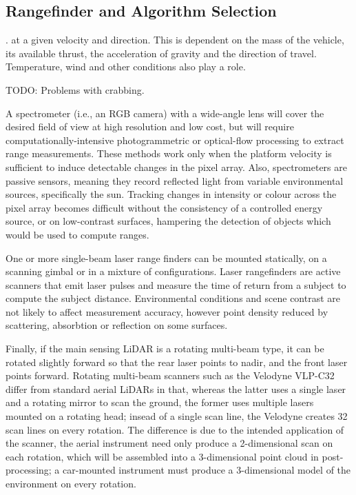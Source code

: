 \documentclass[10pt,a4paper]{report}
\begin{document}
\subsection{Rangefinder and Algorithm Selection}


.  at a given velocity and direction. This is dependent on the mass of the vehicle, its available thrust, the acceleration of gravity and the direction of travel. Temperature, wind and other conditions also play a role. 

TODO: Problems with crabbing.

A spectrometer (i.e., an RGB camera) with a wide-angle lens will cover the desired field of view at high resolution and low cost, but will require computationally-intensive photogrammetric or optical-flow processing to extract range measurements. These methods work only when the platform velocity is sufficient to induce detectable changes in the pixel array. Also, spectrometers are passive sensors, meaning they record reflected light from variable environmental sources, specifically the sun. Tracking changes in intensity or colour across the pixel array becomes difficult without the consistency of a controlled energy source, or on low-contrast surfaces, hampering the detection of objects which would be used to compute ranges.

One or more single-beam laser range finders can be mounted statically, on a scanning gimbal or in a mixture of configurations. Laser rangefinders are active scanners that emit laser pulses and measure the time of return from a subject to compute the subject distance. Environmental conditions and scene contrast are not likely to affect measurement accuracy, however point density reduced by scattering, absorbtion or reflection on some surfaces. 

Finally, if the main sensing LiDAR is a rotating multi-beam type, it can be rotated slightly forward so that the rear laser points to nadir, and the front laser points forward. Rotating multi-beam scanners such as the Velodyne VLP-C32 differ from standard aerial LiDARs in that, whereas the latter uses a single laser and a rotating mirror to scan the ground, the former uses multiple lasers mounted on a rotating head; insead of a single scan line, the Velodyne creates 32 scan lines on every rotation. The difference is due to the intended application of the scanner, the aerial instrument need only produce a 2-dimensional scan on each rotation, which will be assembled into a 3-dimensional point cloud in post-processing; a car-mounted instrument must produce a 3-dimensional model of the environment on every rotation.
\end{document}

